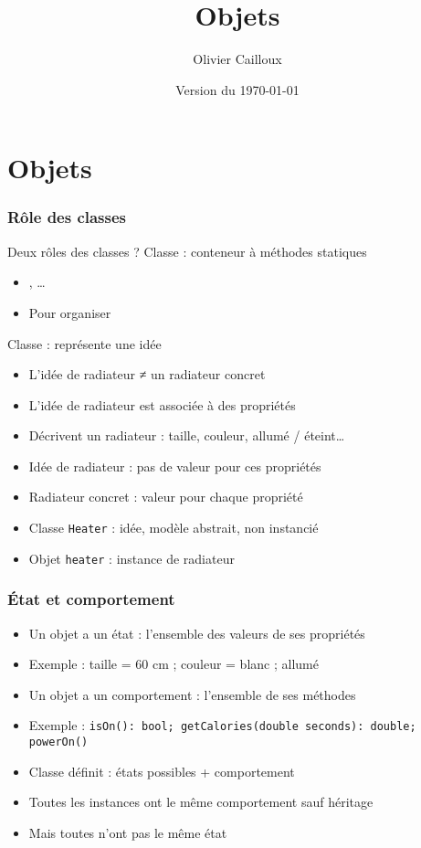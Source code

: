 \documentclass[english, french]{beamer}
\title{Objets}
\subtitle{}
\author{Olivier Cailloux}
\institute[LAMSADE]{LAMSADE, Université Paris-Dauphine}
\date{Version du \today}
\begin{document}


\begin{frame}[plain]
   \titlepage
\end{frame}
\addtocounter{framenumber}{-1}

\section{Objets}
\begin{frame}
	\frametitle{Rôle des classes}
	Deux rôles des classes ? \pause
	Classe : conteneur à méthodes statiques
	\begin{itemize}
		\item {}, …
		\item Pour organiser
	\end{itemize}
	Classe : représente une idée
	\begin{itemize}
		\item L’idée de radiateur ≠ un radiateur concret
		\item L’idée de radiateur est associée à des propriétés 
		\item Décrivent un radiateur : taille, couleur, allumé / éteint…
		\item Idée de radiateur : pas de valeur pour ces propriétés
		\item Radiateur concret : valeur pour chaque propriété
		\item Classe \texttt{Heater} : idée, modèle abstrait, non instancié
		\item Objet \texttt{heater} : instance de radiateur
	\end{itemize}
\end{frame}

\begin{frame}
	\frametitle{État et comportement}
	\begin{itemize}
		\item Un objet a un état : l’ensemble des valeurs de ses propriétés
		\item Exemple : {taille = 60 cm ; couleur = blanc ; allumé}
		\item Un objet a un comportement : l’ensemble de ses méthodes
		\item Exemple : \texttt{isOn(): bool; getCalories(double seconds): double; powerOn()}
		\item Classe définit : états possibles + comportement
		\item Toutes les instances ont le même comportement {\tiny sauf héritage}
		\item Mais toutes n’ont pas le même état
	\end{itemize}
\end{frame}
\end{document}

